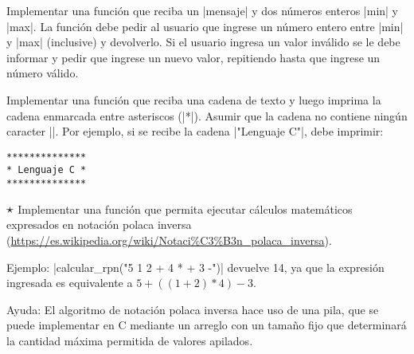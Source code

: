 \begin{ejercicio}
Implementar una función que reciba un |mensaje| y dos números enteros |min| y
|max|. La función debe pedir al usuario que ingrese un número entero entre
|min| y |max| (inclusive) y devolverlo. Si el usuario ingresa un valor
inválido se le debe informar y pedir que ingrese un nuevo valor, repitiendo
hasta que ingrese un número válido.
\end{ejercicio}

\begin{ejercicio}
Implementar una función que reciba una cadena de texto y
luego imprima la cadena enmarcada entre asteriscos (|*|). Asumir que la cadena
no contiene ningún caracter |\n|. Por ejemplo, si se recibe la cadena
|"Lenguaje C"|, debe imprimir:

\begin{verbatim}
**************
* Lenguaje C *
**************
\end{verbatim}
\end{ejercicio}

\begin{ejercicio}
$\dificil$ Implementar una función que permita ejecutar cálculos matemáticos
expresados en notación polaca inversa
(\url{https://es.wikipedia.org/wiki/Notaci%C3%B3n_polaca_inversa}).

Ejemplo: |calcular_rpn("5 1 2 + 4 * + 3 -")| devuelve 14, ya que la expresión
ingresada es equivalente a $5+((1+2)*4)-3$.

Ayuda: El algoritmo de notación polaca inversa hace uso de una pila,
que se puede implementar en C mediante un arreglo con un tamaño
fijo que determinará la cantidad máxima permitida de valores apilados.
\end{ejercicio}
